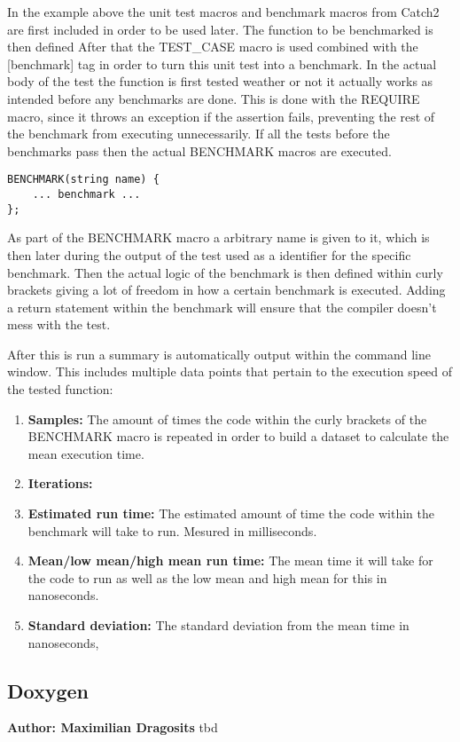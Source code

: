 In the example above the unit test macros and benchmark macros from Catch2 are first included in order to be used later. The function to be benchmarked is then defined
After that the TEST\_CASE macro is used combined with the [\!benchmark] tag in order to turn this unit test into a benchmark. In the actual body of the test the function
is first tested weather or not it actually works as intended before any benchmarks are done. This is done with the REQUIRE macro, since it throws an exception if the 
assertion fails, preventing the rest of the benchmark from executing unnecessarily. If all the tests before the benchmarks pass then the actual BENCHMARK macros are
executed.

\begin{verbatim}
BENCHMARK(string name) {
    ... benchmark ...
};
\end{verbatim}

As part of the BENCHMARK macro a arbitrary name is given to it, which is then later during the output of the test used as a identifier for the specific benchmark.
Then the actual logic of the benchmark is then defined within curly brackets giving a lot of freedom in how a certain benchmark is executed. Adding a return statement
within the benchmark will ensure that the compiler doesn't mess with the test.

After this is run a summary is automatically output within the command line window. This includes multiple data points that pertain to the execution speed of the tested
function:
\begin{enumerate}
    \item \textbf{Samples:} The amount of times the code within the curly brackets of the BENCHMARK macro is repeated in order to build a dataset to calculate the mean execution time.
    \item \textbf{Iterations:} %
    \item \textbf{Estimated run time:} The estimated amount of time the code within the benchmark will take to run. Mesured in milliseconds.
    \item \textbf{Mean/low mean/high mean run time:} The mean time it will take for the code to run as well as the low mean and high mean for this in nanoseconds.
    \item \textbf{Standard deviation:} The standard deviation from the mean time in nanoseconds,
\end{enumerate}

\subsection{Doxygen}
\textbf{Author: Maximilian Dragosits}
tbd

